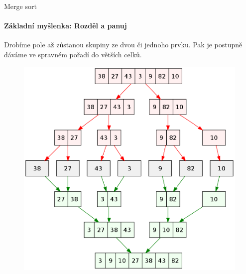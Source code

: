 \documentclass[11pt,final]{beamer}
\begin{document}
	\begin{frame}{Merge sort}
		\framesubtitle{Základní myšlenka: Rozděl a panuj}
		Drobíme pole až zůstanou skupiny ze dvou či jednoho prvku. Pak je postupně dáváme ve spravném pořadí do větších celků.
		\begin{figure}
			\includegraphics[scale=0.15]{wikimerge.png}
		\end{figure}
	\end{frame}
\end{document}
